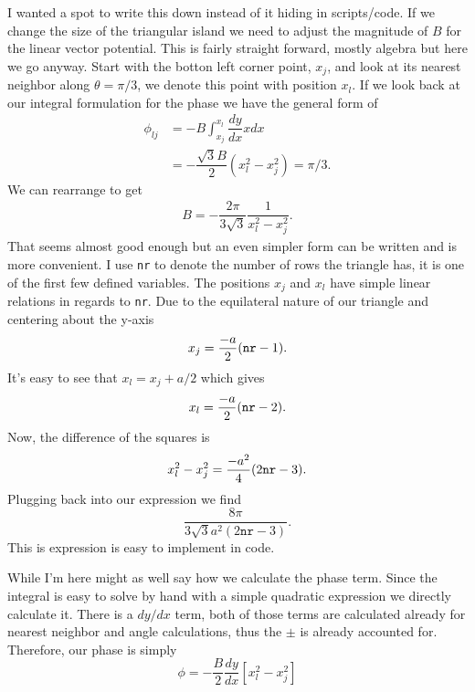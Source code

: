 I wanted a spot to write this down instead of it hiding in scripts/code.
If we change the size of the triangular island we need to adjust the magnitude of $B$ for the linear vector potential.
This is fairly straight forward, mostly algebra but here we go anyway.
Start with the botton left corner point, $x_j$, and look at its nearest neighbor along $\theta=\pi/3$, we denote this point with position $x_l$.
If we look back at our integral formulation for the phase we have the general form of
\begin{align}
  \phi_{lj} &= -B \int_{x_j}^{x_l} \dfrac{dy}{dx} x dx \nonumber \\
  &= -\dfrac{\sqrt{3} B}{2} (x_l^2 - x_j^2) = \pi/3. \nonumber
\end{align}
We can rearrange to get
\begin{align}
  B = -\dfrac{2 \pi}{3 \sqrt{3}} \dfrac{1}{x_l^2 - x_j^2}.
\end{align}
That seems almost good enough but an even simpler form can be written and is more convenient.
I use \verb|nr| to denote the number of rows the triangle has, it is one of the first few defined variables.
The positions $x_j$ and $x_l$ have simple linear relations in regards to \verb|nr|.
Due to the equilateral nature of our triangle and centering about the y-axis
\begin{equation}
  x_j = \dfrac{-a}{2} (\verb|nr| - 1).
\end{equation}
It's easy to see that $x_l = x_j + a/2$ which gives
\begin{equation}
  x_l = \dfrac{-a}{2} (\verb|nr| - 2).
\end{equation}
Now, the difference of the squares is
\begin{equation}
  x_l^2 - x_j^2 = \dfrac{-a^2}{4} (2 \verb|nr| - 3).
\end{equation}
Plugging back into our expression we find
\begin{equation}
  \dfrac{8 \pi}{3 \sqrt{3} a^2 (2 \texttt{nr}- 3)}.
\end{equation}
This is expression is easy to implement in code.

While I'm here might as well say how we calculate the phase term.
Since the integral is easy to solve by hand with a simple quadratic expression we directly calculate it.
There is a $dy/dx$ term, both of those terms are calculated already for nearest neighbor and angle calculations, thus the $\pm$ is already accounted for.
Therefore, our phase is simply
\begin{equation}
  \phi = -\dfrac{B}{2} \dfrac{dy}{dx} [x_l^2 - x_j^2]
\end{equation}
